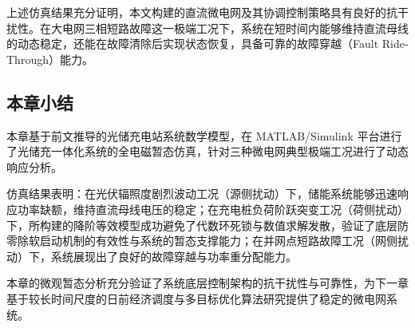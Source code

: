 上述仿真结果充分证明，本文构建的直流微电网及其协调控制策略具有良好的抗干扰性。在大电网三相短路故障这一极端工况下，系统在短时间内能够维持直流母线的动态稳定，还能在故障清除后实现状态恢复，具备可靠的故障穿越（Fault Ride-Through）能力。

\subsection{本章小结}

本章基于前文推导的光储充电站系统数学模型，在 MATLAB/Simulink 平台进行了光储充一体化系统的全电磁暂态仿真，针对三种微电网典型极端工况进行了动态响应分析。

仿真结果表明：在光伏辐照度剧烈波动工况（源侧扰动）下，储能系统能够迅速响应功率缺额，维持直流母线电压的稳定；在充电桩负荷阶跃突变工况（荷侧扰动）下，所构建的降阶等效模型成功避免了代数环死锁与数值求解发散，验证了底层防零除软启动机制的有效性与系统的暂态支撑能力；在并网点短路故障工况（网侧扰动）下，系统展现出了良好的故障穿越与功率重分配能力。

本章的微观暂态分析充分验证了系统底层控制架构的抗干扰性与可靠性，为下一章基于较长时间尺度的日前经济调度与多目标优化算法研究提供了稳定的微电网系统。
